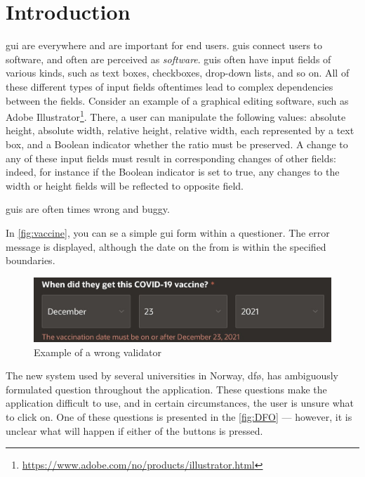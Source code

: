 \chapter{Introduction}

\gls{gui} are everywhere and are important for end users. \gls{gui}s connect users to software, and often are perceived as \emph{software}. \gls{gui}s often have input fields of various kinds, such as text boxes, checkboxes, drop-down lists, and so on. All of these different types of input fields oftentimes lead to complex dependencies between the fields. Consider an example of a graphical editing software, such as Adobe Illustrator\footnote{\url{https://www.adobe.com/no/products/illustrator.html}}. There, a user can manipulate the following values: absolute height, absolute width, relative height, relative width, each represented by a text box, and a Boolean indicator whether the ratio must be preserved. A change to any of these input fields must result in corresponding changes of other fields: indeed, for instance if the Boolean indicator is set to true, any changes to the width or height fields will be reflected to opposite field.

\gls{gui}s are often times wrong and buggy. 

In \autoref{fig:vaccine}, you can se a simple \gls{gui} form within a questioner. The error message is displayed, although the date on the from is within the specified boundaries.

\begin{figure}
    \centering
    \includegraphics[scale=0.35]{figures/vaccine.jpeg}
    \caption{Example of a wrong validator}
    \label{fig:vaccine}
\end{figure}

The new system used by several universities in Norway, \gls{dfø}, has ambiguously formulated question throughout the application. These questions make the application difficult to use, and in certain circumstances, the user is unsure what to click on. One of these questions is presented in the \autoref{fig:DFO} --- however, it is unclear what will happen if either of the buttons is pressed.

